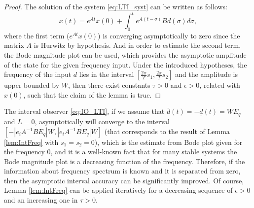 \documentclass[letterpaper, 10 pt, conference]{ieeeconf}
\theoremstyle{plain}
\theoremstyle{definition}
\theoremstyle{plain}
\theoremstyle{plain}
\theoremstyle{remark}
\begin{document}
\begin{proof}
The solution of the system \eqref{eq:LTI_syst} can be written as follows:
\[
x(t)=e^{At}x(0)+\int_{0}^{t}e^{A(t-\sigma)}B d(\sigma)d\sigma,
\]
where the first term ($e^{At}x(0)$) is converging asymptotically to zero since the matrix $A$ is Hurwitz by hypothesis. And in order to estimate the second term, the Bode magnitude plot can be used, which provides the asymptotic amplitude of the state for the given frequency input. Under the introduced hypotheses, the frequency of the input $d$ lies in the interval $[\frac{2\pi}{T}s_{1},\frac{2\pi}{T}s_{2}]$ and the amplitude is upper-bounded by $W$, then there exist constants $\tau>0$ and $\epsilon>0$, related with $x(0)$, such that the claim of the lemma is true.
\end{proof}
The interval observer \eqref{eq:IO_LTI}, if we assume that $\overline{d}(t)=-\underline{d}(t)=WE_{q}$ and $L=0$, asymptotically will converge to the interval $[-|e_{i}A{}^{-1}BE_{q}|W,|e_{i}A{}^{-1}BE_{q}|W]$ (that corresponds to the result of Lemma \ref{lem:IntFreq} with $s_{1}=s_{2}=0$), which is the estimate from Bode plot given for the frequency $0$, and it is a well-known fact that for many stable systems the Bode magnitude plot is a decreasing function of the frequency. Therefore, if the information about frequency spectrum is known and it is separated from zero, then the asymptotic interval accuracy can be significantly improved. Of course, Lemma \ref{lem:IntFreq} can be applied iteratively for a decreasing sequence of $\epsilon>0$ and an increasing one in $\tau>0$.
\end{document}

